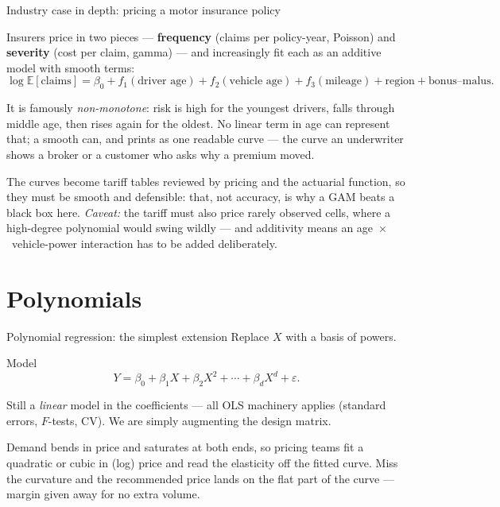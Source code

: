 \documentclass[aspectratio=169,11pt]{beamer}
\begin{document}
\begin{frame}{Industry case in depth: pricing a motor insurance policy}
  \footnotesize
  \begin{industry}
    Insurers price in two pieces --- \textbf{frequency} (claims per policy-year, Poisson) and \textbf{severity} (cost per claim, gamma) --- and increasingly fit each as an additive model with smooth terms:
    \[ \log\mathbb{E}[\text{claims}]=\beta_0+f_1(\text{driver age})+f_2(\text{vehicle age})+f_3(\text{mileage})+\text{region}+\text{bonus--malus}. \]
  \end{industry}
  \begin{readme}
    It is famously \emph{non-monotone}: risk is high for the youngest drivers, falls through middle age, then rises again for the oldest. No linear term in age can represent that; a smooth can, and prints as one readable curve --- the curve an underwriter shows a broker or a customer who asks why a premium moved.
  \end{readme}
  \begin{takeaway}
    The curves become tariff tables reviewed by pricing and the actuarial function, so they must be smooth and defensible: that, not accuracy, is why a GAM beats a black box here. \emph{Caveat:} the tariff must also price rarely observed cells, where a high-degree polynomial would swing wildly --- and additivity means an age~$\times$~vehicle-power interaction has to be added deliberately.
  \end{takeaway}
\end{frame}


\section{Polynomials}

\begin{frame}{Polynomial regression: the simplest extension}
  Replace $X$ with a basis of powers.
  \begin{block}{Model}
    \[
      Y = \beta_0 + \beta_1 X + \beta_2 X^2 + \cdots + \beta_d X^d + \varepsilon.
    \]
  \end{block}
  \begin{readme}
    Still a \emph{linear} model in the coefficients --- all OLS
    machinery applies (standard errors, $F$-tests, CV). We are simply
    augmenting the design matrix.
  \end{readme}
  \begin{industry}
    Demand bends in price and saturates at both ends, so pricing teams fit a quadratic or cubic in (log) price and read the elasticity off the fitted curve. Miss the curvature and the recommended price lands on the flat part of the curve --- margin given away for no extra volume.
  \end{industry}
\end{frame}
\end{document}
